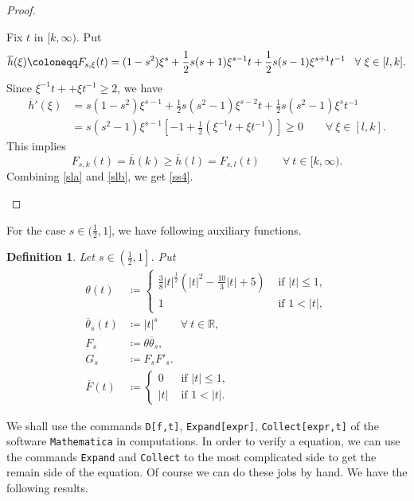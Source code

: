\documentclass[11pt, a4paper]{article}
\newtheorem{definition}{Definition}%
\numberwithin{equation}{section}
\newcommand{\hk}{\hspace*{.12in}}
\newcommand{\RR}{{\mathbb R}}
\newcommand{\abs}[1]{\left\lvert #1\right\rvert}
\begin{document}
\begin{proof}
\begin{itemize}[wide]
Fix $t$ in $[k,\infty)$. Put
\[\overline{h}(\xi)\coloneqq F_{s,\xi}(t)=(1-s^{2})\xi^{s}+ \frac{1}{2}s(s+1)\xi^{s-1}t+\frac{1}{2}s(s-1)\xi^{s+1}t^{-1}\hk\forall~\xi\in[l,k].\]
Since $\xi^{-1}t++\xi t^{-1} \ge 2$, we have 
\begin{align*}
  \overline{h}'(\xi)
  &= s\left(1-s^{2} \right)\xi^{s-1}+ \frac{1}{2}s\left(s^{2}-1
    \right)\xi^{s-2}t+\frac{1}{2}s\left(s^{2}-1 \right)\xi^{s}t^{-1}\\
  &= s\left(s^{2}-1 \right)\xi^{s-1} \left[-1+ \frac{1}{2} \left(\xi^{-1}t+\xi t^{-1} \right) \right]\ge 0 \qquad\forall~\xi\in[l,k].
\end{align*}
This  implies
\begin{equation}F_{s,k}(t)=\overline{h}(k)\ge  \overline{h}(l) =F_{s,l}(t)\qquad\forall~t\in [k,\infty).
\label{slb}
\end{equation}
Combining \eqref{sla} and \eqref{slb}, we get \eqref{ss4}.
\end{itemize}
\end{proof}

For the case  $s\in (\frac{1}{2},1]$, we have following auxiliary functions.
\begin{definition}
  Let $s \in \left(\frac{1}{2},1 \right]$. Put
  \begin{align}
    \theta(t)
    &\coloneqq \begin{cases}
      \frac{3}{8} \abs{t}^{\frac{1}{2}} \left(\abs{t}^{2}-\frac{10}{3}\abs{t} +5
      \right)&\text{ if } \abs{t} \le 1,\\
      1 &\text{ if } 1 <\abs{t},
\end{cases}
\label{fs1}\\
\overline{\theta}_{s}(t)
&\coloneqq \abs{t}^{s}\qquad\forall~t\in\RR ,
\label{fs2}\\
F_{s}
&\coloneqq \theta\overline{\theta}_{s},
\label{fs3}\\
G_{s}
&\coloneqq F_{s}F'_{s}.
\label{fs4}\\
\overline{F}(t)
&\coloneqq \begin{cases}
0&\text{ if } \abs{t} \le 1,\\
\abs{t} &\text{ if } 1 <\abs{t}.
\end{cases}
\label{fs1z}
\end{align}
\label{defs1}
\end{definition}

We shall use the commands \texttt{D[f,t]}, \texttt{Expand[expr]}, \texttt{Collect[expr,t]} of the
software \texttt{Mathematica} in computations. In order to verify a equation,
we can use the commands  \texttt{Expand} and \texttt{Collect} to the most complicated
side to get the remain side of the equation. Of course we can do these
jobs by hand.  We have the following results.
\end{document}
